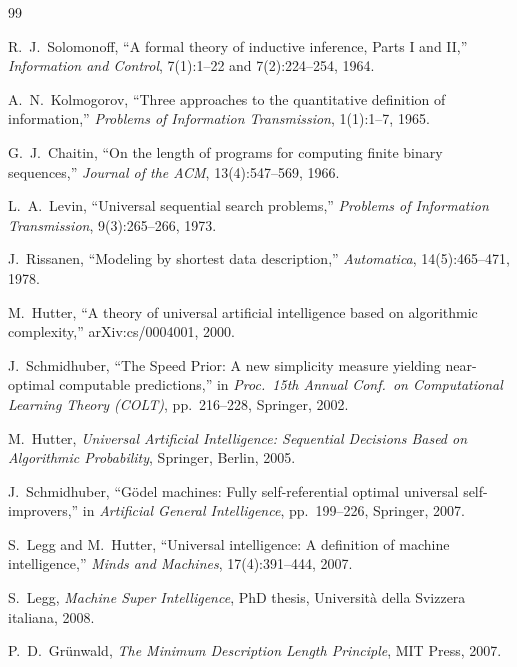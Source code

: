 \documentclass[11pt,a4paper]{article}
\theoremstyle{definition}
\theoremstyle{remark}
\begin{document}
\begingroup
\raggedright
\begin{thebibliography}{99}

R.~J.\ Solomonoff,
``A formal theory of inductive inference, Parts I and II,''
\emph{Information and Control}, 7(1):1--22 and 7(2):224--254, 1964.

A.~N.\ Kolmogorov,
``Three approaches to the quantitative definition of information,''
\emph{Problems of Information Transmission}, 1(1):1--7, 1965.

G.~J.\ Chaitin,
``On the length of programs for computing finite binary sequences,''
\emph{Journal of the ACM}, 13(4):547--569, 1966.

L.~A.\ Levin,
``Universal sequential search problems,''
\emph{Problems of Information Transmission}, 9(3):265--266, 1973.

J.~Rissanen,
``Modeling by shortest data description,''
\emph{Automatica}, 14(5):465--471, 1978.

M.~Hutter,
``A theory of universal artificial intelligence based on algorithmic
complexity,'' arXiv:cs/0004001, 2000.

J.~Schmidhuber,
``The Speed Prior: A new simplicity measure yielding near-optimal
computable predictions,''
in \emph{Proc.\ 15th Annual Conf.\ on Computational Learning Theory (COLT)},
pp.~216--228, Springer, 2002.

M.~Hutter,
\emph{Universal Artificial Intelligence: Sequential Decisions Based on
Algorithmic Probability},
Springer, Berlin, 2005.

J.~Schmidhuber,
``G\"odel machines: Fully self-referential optimal universal self-improvers,''
in \emph{Artificial General Intelligence}, pp.~199--226, Springer, 2007.

S.~Legg and M.~Hutter,
``Universal intelligence: A definition of machine intelligence,''
\emph{Minds and Machines}, 17(4):391--444, 2007.

S.~Legg,
\emph{Machine Super Intelligence},
PhD thesis, Universit\`a della Svizzera italiana, 2008.

P.~D.\ Gr\"unwald,
\emph{The Minimum Description Length Principle},
MIT Press, 2007.


\end{thebibliography}
\end{document}
